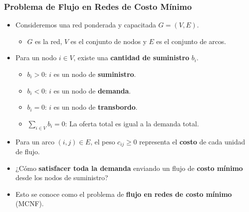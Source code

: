\documentclass{beamer}
\begin{document}
\begin{frame}
    \frametitle{Problema de Flujo en Redes de Costo Mínimo}
    
    \begin{itemize}
        \item Consideremos una red ponderada y capacitada $G = (V, E)$.
        \begin{itemize}
            \item $G$ es la red, $V$ es el conjunto de nodos y $E$ es el conjunto de arcos.
        \end{itemize}
        \item Para un nodo $i \in V$, existe una \textbf{cantidad de suministro} $b_i$.
        \begin{itemize}
            \item $b_i > 0$: $i$ es un nodo de \textbf{suministro}.
            \item $b_i < 0$: $i$ es un nodo de \textbf{demanda}.
            \item $b_i = 0$: $i$ es un nodo de \textbf{transbordo}.
            \item $\sum_{i \in V} b_i = 0$: La oferta total es igual a la demanda total.
        \end{itemize}
        \item Para un arco $(i,j) \in E$, el peso $c_{ij} \geq 0$ representa el \textbf{costo} de cada unidad de flujo.
        \item ¿Cómo \textbf{satisfacer toda la demanda} enviando un flujo de \textbf{costo mínimo} desde los nodos de suministro?
        \item Esto se conoce como el problema de \textbf{flujo en redes de costo mínimo} (MCNF).
    \end{itemize}

\end{frame}
\end{document}
